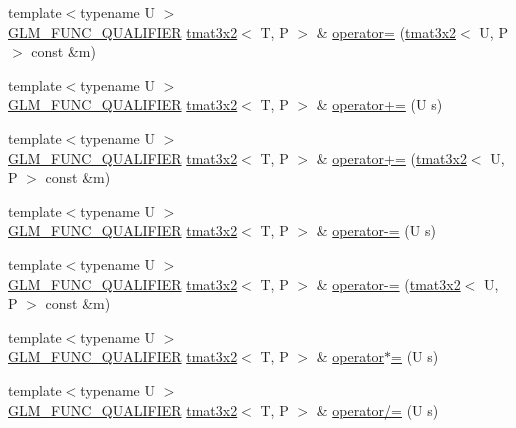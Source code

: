 \begin{DoxyCompactItemize}
\item 
{\footnotesize template$<$typename U $>$ }\\\hyperlink{setup_8hpp_a33fdea6f91c5f834105f7415e2a64407}{G\+L\+M\+\_\+\+F\+U\+N\+C\+\_\+\+Q\+U\+A\+L\+I\+F\+I\+ER} \hyperlink{structglm_1_1detail_1_1tmat3x2}{tmat3x2}$<$ T, P $>$ \& \hyperlink{structglm_1_1detail_1_1tmat3x2_a309bf07e7e7ba0f6f356d5848407602c}{operator=} (\hyperlink{structglm_1_1detail_1_1tmat3x2}{tmat3x2}$<$ U, P $>$ const \&m)
\item 
{\footnotesize template$<$typename U $>$ }\\\hyperlink{setup_8hpp_a33fdea6f91c5f834105f7415e2a64407}{G\+L\+M\+\_\+\+F\+U\+N\+C\+\_\+\+Q\+U\+A\+L\+I\+F\+I\+ER} \hyperlink{structglm_1_1detail_1_1tmat3x2}{tmat3x2}$<$ T, P $>$ \& \hyperlink{structglm_1_1detail_1_1tmat3x2_a66decc5a8a5a5001d207abeedf367e2a}{operator+=} (U s)
\item 
{\footnotesize template$<$typename U $>$ }\\\hyperlink{setup_8hpp_a33fdea6f91c5f834105f7415e2a64407}{G\+L\+M\+\_\+\+F\+U\+N\+C\+\_\+\+Q\+U\+A\+L\+I\+F\+I\+ER} \hyperlink{structglm_1_1detail_1_1tmat3x2}{tmat3x2}$<$ T, P $>$ \& \hyperlink{structglm_1_1detail_1_1tmat3x2_aeb063f61f41be8039bf8e5b40b40ae50}{operator+=} (\hyperlink{structglm_1_1detail_1_1tmat3x2}{tmat3x2}$<$ U, P $>$ const \&m)
\item 
{\footnotesize template$<$typename U $>$ }\\\hyperlink{setup_8hpp_a33fdea6f91c5f834105f7415e2a64407}{G\+L\+M\+\_\+\+F\+U\+N\+C\+\_\+\+Q\+U\+A\+L\+I\+F\+I\+ER} \hyperlink{structglm_1_1detail_1_1tmat3x2}{tmat3x2}$<$ T, P $>$ \& \hyperlink{structglm_1_1detail_1_1tmat3x2_af77215fb32bc46ef8b32f044ef9bdab6}{operator-\/=} (U s)
\item 
{\footnotesize template$<$typename U $>$ }\\\hyperlink{setup_8hpp_a33fdea6f91c5f834105f7415e2a64407}{G\+L\+M\+\_\+\+F\+U\+N\+C\+\_\+\+Q\+U\+A\+L\+I\+F\+I\+ER} \hyperlink{structglm_1_1detail_1_1tmat3x2}{tmat3x2}$<$ T, P $>$ \& \hyperlink{structglm_1_1detail_1_1tmat3x2_a27015cfc43f110539d46ab697ce67d4b}{operator-\/=} (\hyperlink{structglm_1_1detail_1_1tmat3x2}{tmat3x2}$<$ U, P $>$ const \&m)
\item 
{\footnotesize template$<$typename U $>$ }\\\hyperlink{setup_8hpp_a33fdea6f91c5f834105f7415e2a64407}{G\+L\+M\+\_\+\+F\+U\+N\+C\+\_\+\+Q\+U\+A\+L\+I\+F\+I\+ER} \hyperlink{structglm_1_1detail_1_1tmat3x2}{tmat3x2}$<$ T, P $>$ \& \hyperlink{structglm_1_1detail_1_1tmat3x2_af59d2d25557d16f13ff7fd79fa94bfd0}{operator$\ast$=} (U s)
\item 
{\footnotesize template$<$typename U $>$ }\\\hyperlink{setup_8hpp_a33fdea6f91c5f834105f7415e2a64407}{G\+L\+M\+\_\+\+F\+U\+N\+C\+\_\+\+Q\+U\+A\+L\+I\+F\+I\+ER} \hyperlink{structglm_1_1detail_1_1tmat3x2}{tmat3x2}$<$ T, P $>$ \& \hyperlink{structglm_1_1detail_1_1tmat3x2_ab8db479d66f6b4cac2c02b9e5a2e40d8}{operator/=} (U s)
\end{DoxyCompactItemize}



